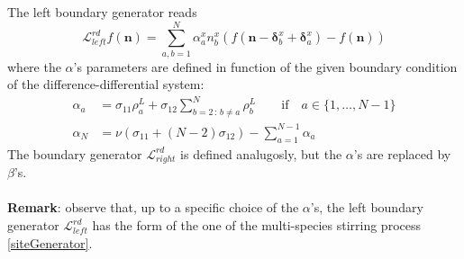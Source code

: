 \documentclass[10pt]{article}
\numberwithin{equation}{section}
\numberwithin{equation}{subsection}
\begin{document}
The left boundary generator reads
\begin{equation}
	\mathcal{L}_{left}^{rd}f(\bm{n})=\sum_{a,b=1}^{N}\alpha_{a}^{x}n_{b}^{x}\left(f(\bm{n}-\bm{\delta}_{b}^{x}+\bm{\delta}_{a}^{x})-f(\bm{n})\right)
\end{equation}
where the $\alpha$'s parameters are defined in function of the given boundary condition of the difference-differential system:
\begin{equation}\label{boundaryParamRD}
	\begin{split}
		\alpha_{a}&=\sigma_{11}\rho_{a}^{L}+\sigma_{12}\sum_{b=2\,:\,b\neq a}^{N}\rho_{b}^{L}\qquad \text{if} \quad a\in \{1,\ldots,N-1\}\\
		\alpha_{N}&=\nu\left(\sigma_{11}+(N-2)\sigma_{12}\right)-\sum_{a=1}^{N-1}\alpha_{a}
	\end{split}
\end{equation}
The boundary generator $\mathcal{L}_{right}^{rd}$ is defined analugosly, but the $\alpha$'s are replaced by $\beta$'s. \\ \\
\textbf{Remark}: observe that, up to a specific choice of the $\alpha$'s, the left boundary generator $\mathcal{L}_{left}^{rd}$ has the form of the one of the multi-species stirring process \eqref{siteGenerator}. 
\end{document}
